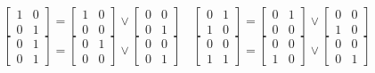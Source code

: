 \documentclass{article}
\begin{document}
$$
\begin{bmatrix}
    1 & 0\\
    0 & 1
\end{bmatrix}
=
\begin{bmatrix}
    1 & 0\\
    0 & 0
\end{bmatrix}
\lor
\begin{bmatrix}
    0 & 0\\
    0 & 1
\end{bmatrix}
\quad 
\begin{bmatrix}
    0 & 1\\
    1 & 0
\end{bmatrix}
=
\begin{bmatrix}
    0 & 1\\
    0 & 0
\end{bmatrix}
\lor
\begin{bmatrix}
    0 & 0\\
    1 & 0
\end{bmatrix}
$$
$$
\begin{bmatrix}
    0 & 1\\
    0 & 1
\end{bmatrix}
=
\begin{bmatrix}
    0 & 1\\
    0 & 0
\end{bmatrix}
\lor
\begin{bmatrix}
    0 & 0\\
    0 & 1
\end{bmatrix}
\quad 
\begin{bmatrix}
    0 & 0\\
    1 & 1
\end{bmatrix}
=
\begin{bmatrix}
    0 & 0\\
    1 & 0
\end{bmatrix}
\lor
\begin{bmatrix}
    0 & 0\\
    0 & 1
\end{bmatrix}
$$
\end{document}
